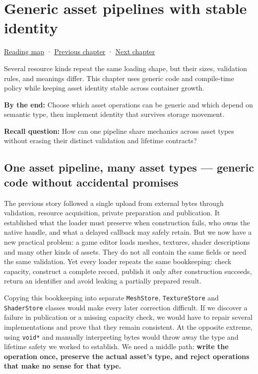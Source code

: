 \hypertarget{05-engine-i-ch005}{}
\chapter{Generic asset pipelines with stable identity}\label{05-engine-i-ch005-generic-asset-pipelines-with-stable-identity}

\hyperref[volume-reading-map]{Reading map} · \hyperref[05-engine-i-ch004-resource-ownership-failure-paths-and-review-practice]{Previous chapter} · \hyperref[05-engine-i-ch006-queries-lazy-ranges-allocators-and-module-boundaries]{Next chapter}

Several resource kinds repeat the same loading shape, but their sizes, validation rules, and meanings differ. This chapter uses generic code and compile-time policy while keeping asset identity stable across container growth.

\textbf{By the end:} Choose which asset operations can be generic and which depend on semantic type, then implement identity that survives storage movement.

\textbf{Recall question:} How can one pipeline share mechanics across asset types without erasing their distinct validation and lifetime contracts?

\section{One asset pipeline, many asset types --- generic code without accidental promises}\label{05-engine-i-ch005-one-asset-pipeline-many-asset-types-generic-code-without-accidental-promises}

The previous story followed a single upload from external bytes through validation, resource acquisition, private preparation and publication. It established what the loader must preserve when construction fails, who owns the native handle, and what a delayed callback may safely retain. But we now have a new practical problem: a game editor loads meshes, textures, shader descriptions and many other kinds of assets. They do not all contain the same fields or need the same validation. Yet every loader repeats the same bookkeeping: check capacity, construct a complete record, publish it only after construction succeeds, return an identifier and avoid leaking a partially prepared result.

Copying this bookkeeping into separate \texttt{MeshStore}, \texttt{TextureStore} and \texttt{ShaderStore} classes would make every later correction difficult. If we discover a failure in publication or a missing capacity check, we would have to repair several implementations and prove that they remain consistent. At the opposite extreme, using \texttt{void*} and manually interpreting bytes would throw away the type and lifetime safety we worked to establish. We need a middle path: \textbf{write the operation once, preserve the actual asset's type, and reject operations that make no sense for that type.}

